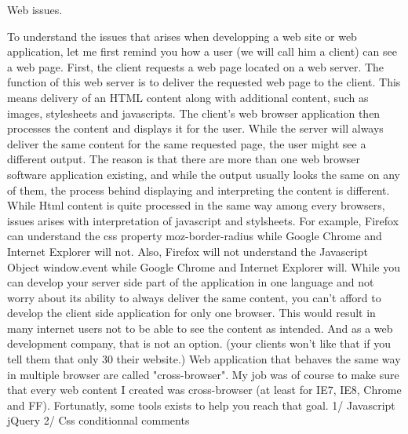 Web issues.

 
To understand the issues that arises when developping a web site or web application, let me first remind you how a 
user (we will call him a client) can see a web page. First, the client requests a web page located on a web server. The function of this web server is 
to deliver the requested web page to the client. This means delivery of an HTML content along with additional content, 
such as images, stylesheets and javascripts. The client's web browser application then processes the content and displays it for the user. 
While the server will always deliver the same content for the same requested page, the user might see a different output. 
The reason is that there are more than one web browser software application existing, and while the output usually looks the same on any of them, the process behind 
displaying and interpreting the content is different. While Html content is quite processed in the same way among every browsers, issues arises with interpretation of
javascript and stylsheets. For example, Firefox can understand the css property moz-border-radius while Google Chrome and Internet Explorer will not. Also, Firefox 
will not understand the Javascript Object window.event while Google Chrome and Internet Explorer will.
While you can develop your server side part of the application in one language and not worry about its ability to always deliver the same content, you can't afford to
develop the client side application for only one browser. This would result in many internet users not to be able to see the content as intended.
And as a web development company, that is not an option. (your clients won't like that if you tell them that only 30 %
their website.)
Web application that behaves the same way in multiple browser are called "cross-browser". 
My job was of course to make sure that every web content I created was cross-browser (at least for IE7, IE8, Chrome and FF).
Fortunatly, some tools exists to help you reach that goal.
1/ Javascript
jQuery
2/ Css
conditionnal comments